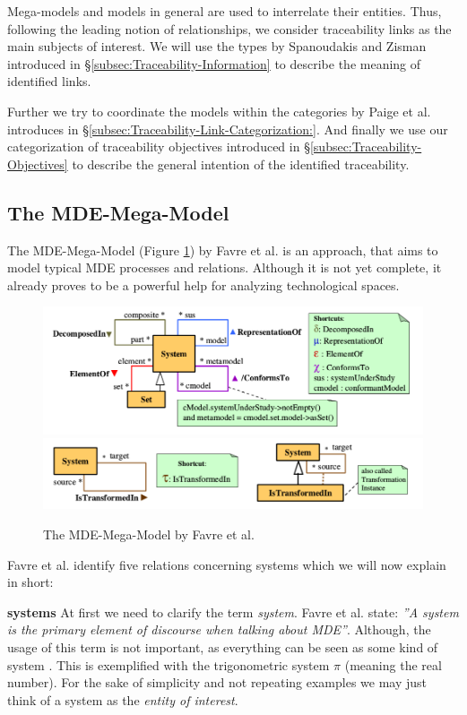 \documentclass[runningheads,a4paper]{llncs}
\begin{document}
Mega-models and models in general are used to interrelate their entities.
Thus, following the leading notion of relationships, we consider traceability links as the main subjects of interest.
We will use the types by Spanoudakis and Zisman introduced in §\ref{subsec:Traceability-Information} to describe the meaning of identified links.

Further we try to coordinate the models within the categories by Paige et al. introduces in §\ref{subsec:Traceability-Link-Categorization:}.
And finally we use our categorization of traceability objectives introduced in §\ref{subsec:Traceability-Objectives} to describe the general intention of the identified traceability.

\subsection{The MDE-Mega-Model}\label{subsec:TheMDEMegaModel}
The MDE-Mega-Model (Figure \ref{fig:TheMDEMegaModel}) by Favre et al. \cite{TowardsAMegamodel} is an approach, that aims to model typical MDE processes and relations. 
Although it is not yet complete, it already proves to be a powerful help for analyzing technological spaces. 
\begin{figure}
\centering
\includegraphics[width=\textwidth]{MDE-MegaModel.png}
\includegraphics[width=\textwidth]{MDE-MegaModel-Transformations.png}
\caption{The MDE-Mega-Model by Favre et al. \cite{TowardsAMegamodel}}
\label{fig:TheMDEMegaModel}
\end{figure}
Favre et al. identify five relations concerning systems which we will now explain in short:

\textbf{systems}
At first we need to clarify the term \textit{system}. 
Favre et al. state: \textit{''A system is the primary element of discourse when talking about MDE''}.
Although, the usage of this term is not important, as everything can be seen as some kind of system \cite{TowardsAMegamodel}. 
This is exemplified with the trigonometric system $\pi$ (meaning the real number). 
For the sake of simplicity and not repeating examples we may just think of a system as the \textit{entity of interest}.
\end{document}
